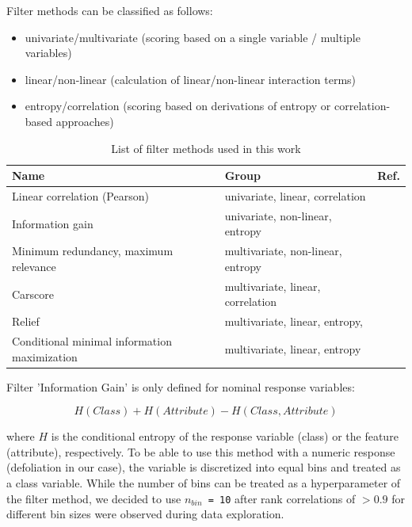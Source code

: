 \documentclass[letterpaper, peerreview, draftcls]{IEEEtran}
\begin{document}
Filter methods can be classified as follows:

\begin{itemize}
	\item univariate/multivariate (scoring based on a single variable / multiple variables)
	\item linear/non-linear (calculation of linear/non-linear interaction terms)
	\item entropy/correlation (scoring based on derivations of entropy or correlation-based approaches)
\end{itemize}

\begin{table}[b!]
\centering
\caption[t]{List of filter methods used in this work}
\begingroup\footnotesize
\begin{adjustbox}{width={0.48\textwidth},totalheight={\textheight},keepaspectratio}
	\begin{tabular}{lll}
		\\
		Name                                         & Group                             & Ref.               \\
		\toprule
		Linear correlation (Pearson)                 & univariate, linear, correlation   & \cite{pearson1901} \\
		Information gain                             & univariate, non-linear, entropy   & \cite{quinlan1986} \\
		Minimum redundancy, maximum relevance        & multivariate, non-linear, entropy & \cite{zhao2013}    \\
		Carscore                                     & multivariate, linear, correlation & \cite{zuber2011}   \\
		Relief                                       & multivariate, linear, entropy,    & \cite{kira1992}    \\
		Conditional minimal information maximization & multivariate, linear, entropy     & \cite{fleuret2004}
	\end{tabular}
\end{adjustbox}
\endgroup\label{tab:filter-methods}
\end{table}

\noindent Filter 'Information Gain' is only defined for nominal response variables:

\begin{equation}
	H(Class) + H(Attribute) - H(Class, Attribute)
\end{equation}

where \(H\) is the conditional entropy of the response variable (class) or the feature (attribute), respectively.
To be able to use this method with a numeric response (defoliation in our case), the variable is discretized into equal bins and treated as a class variable.
While the number of bins can be treated as a hyperparameter of the filter method, we decided to use \texttt{\(n_{bin}\) = 10} after rank correlations of $> 0.9$ for different bin sizes were observed during data exploration.
\end{document}
